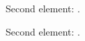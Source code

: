 \documentclass[12pt]{article}
\begin{document}
\displaymylist


Second element: . 

\reversemylist
\displaymylist


Second element: . 
\end{document}
